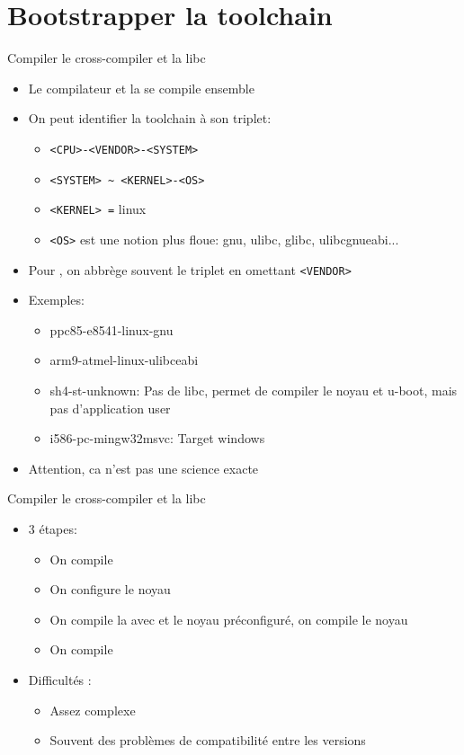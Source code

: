 \section{Bootstrapper la toolchain}

\begin{frame}[fragile=singleslide]{Compiler le cross-compiler et la libc}
  \begin{itemize}
  \item Le compilateur et la  se compile ensemble
  \item On peut identifier la toolchain à son triplet:
    \begin{itemize}
    \item \verb+<CPU>-<VENDOR>-<SYSTEM>+
    \item \verb+<SYSTEM> ~ <KERNEL>-<OS>+
    \item \verb+<KERNEL> =+ linux
    \item \verb+<OS>+  est une notion  plus floue: gnu,  ulibc, glibc,
      ulibcgnueabi...
    \end{itemize}
  \item  Pour ,  on abbrège  souvent le  triplet  en omettant
    \verb+<VENDOR>+
  \item Exemples: 
    \begin{itemize}
    \item ppc85-e8541-linux-gnu %
    \item arm9-atmel-linux-ulibceabi %
    \item sh4-st-unknown: Pas de libc, permet de compiler le noyau
      et u-boot, mais pas d'application user
    \item i586-pc-mingw32msvc: Target windows
    \end{itemize}
  \item Attention, ca n'est pas une science exacte
  \end{itemize}
\end{frame}

\begin{frame}[fragile=singleslide]{Compiler le cross-compiler et la libc}
  \begin{itemize}
  \item 3 étapes: 
    \begin{itemize}
    \item On compile 
    \item On configure le noyau
    \item On  compile la   avec   et le
      noyau préconfiguré, on compile le noyau
    \item On compile 
    \end{itemize}
  \item Difficultés :
    \begin{itemize}
    \item Assez complexe
    \item Souvent des problèmes de compatibilité entre les versions
    \end{itemize}
  \end{itemize}
\end{frame}    

